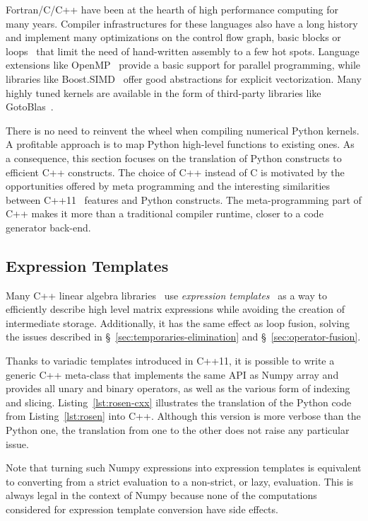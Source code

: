 \documentclass[10pt, preprint]{sigplanconf}
\begin{document}
Fortran/C/C++ have been at the hearth of high performance computing for many years.
Compiler infrastructures for these languages also have a long history and
implement many optimizations on the control flow graph, basic blocks or
loops~\cite{Aho2006} that limit the need of hand-written assembly to a few hot
spots.
Language extensions like OpenMP~\cite{openmp4} provide a basic support for
parallel programming, while libraries like Boost.SIMD~\cite{esterie2012boost}
offer good abstractions for explicit vectorization. Many highly tuned kernels
are available in the form of third-party libraries like
GotoBlas~\cite{gotoblas2008}.

There is no need to reinvent the wheel when compiling numerical Python kernels.
A profitable approach is to map Python high-level functions to existing ones.
As a consequence, this section focuses on the translation of Python constructs
to efficient C++ constructs. The choice of C++ instead of C is motivated by the
opportunities offered by meta programming and the interesting similarities
between C++11~\cite{isocxx11} features and Python constructs.  The
meta-programming part of C++ makes it more than a traditional compiler runtime,
closer to a code generator back-end.

\subsection{Expression Templates}
\label{sec:expression-templates}

Many C++ linear algebra libraries~\cite{eigen,ublas,esterie2014} use \emph{expression
templates}~\cite{expression_templates, et2012} as a way to efficiently describe high
level matrix expressions while avoiding the creation of intermediate storage.
Additionally, it has the same effect as loop fusion, solving the issues
described in \S~\ref{sec:temporaries-elimination} and
\S~\ref{sec:operator-fusion}.

Thanks to variadic templates introduced in C++11, it is possible to write a
generic C++ meta-class that implements the same API as Numpy array and provides
all unary and binary operators, as well as the various form of indexing and
slicing. Listing~\ref{lst:rosen-cxx} illustrates the translation of the Python
code from Listing~\ref{lst:rosen} into C++. Although this version is more
verbose than the Python one, the translation from one to the other does not
raise any particular issue.

Note that turning such Numpy expressions into expression templates is
equivalent to converting from a strict evaluation to a non-strict, or lazy,
evaluation. This is always legal in the context of Numpy because none of the
computations considered for expression template conversion have side effects.
\end{document}
